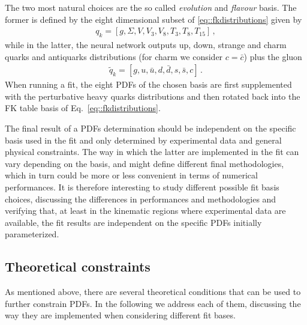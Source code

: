 %
The two most natural choices are the so called \textit{evolution} and \textit{flavour} basis.
The former is defined by the eight dimensional subset of \eqref{eq::fkdistributions} given by 
\begin{align}
    \label{eq:evolution_basis}
    q_k = \left[g, \Sigma, V, V_3, V_8, T_3, T_8, T_{15} \right]\,,
\end{align}
while in the latter, the neural network outputs   
up, down, strange and charm quarks and antiquarks distributions (for charm we consider $c=\bar{c}$) plus the gluon
\begin{align}
    \label{eq:flavour_basis}
	\tilde{q}_k = \left[g, u, \bar{u}, d, \bar{d}, s, \bar{s}, c\right]\,.
\end{align} 
When running a fit, the eight PDFs of the chosen basis are first supplemented with the perturbative heavy quarks
distributions and then rotated back into the FK table basis of Eq.~\eqref{eq::fkdistributions}.

%
The final result of a PDFs determination should be independent on the specific basis used in the fit
and only determined by experimental data and general physical constraints.
The way in which the latter are implemented in the fit can vary depending on the basis,
and might define different final methodologies, which in turn could be more or less convenient
in terms of numerical performances. It is therefore interesting to study different possible
fit basis choices, discussing the differences in performances and methodologies and verifying that,
at least in the kinematic regions where experimental data are available, the 
fit results are independent on the specific PDFs initially parameterized.


\subsection{Theoretical constraints}
\label{sec:theory_constraints}

As mentioned above, there are several theoretical conditions that can be used to further constrain PDFs.
In the following we address each of them, discussing the way they are implemented when considering
different fit bases.

%
